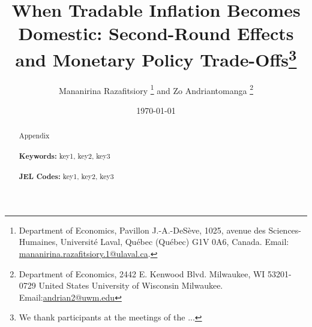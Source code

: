\documentclass[a4paper,12pt]{article}
\begin{document}
\begin{titlepage}
\title{When Tradable Inflation Becomes Domestic: Second-Round Effects and Monetary Policy Trade-Offs\thanks{We thank participants at the meetings of the ...}}
\author{Mananirina Razafitsiory \thanks{Department of Economics, Pavillon J.-A.-DeS\`eve, 1025, avenue des Sciences-Humaines, Universit\'e Laval, Qu\'ebec (Qu\'ebec) G1V 0A6, Canada.  Email: \url{mananirina.razafitsiory.1@ulaval.ca}.
} and Zo Andriantomanga \thanks{Department of Economics, 2442 E. Kenwood Blvd. Milwaukee, WI 53201-0729 United States University of Wisconsin Milwaukee.  Email:\url{andrian2@uwm.edu}}
}

\date{\today}
\maketitle
\begin{abstract}
\noindent Appendix \\
\vspace{0in}\\
\noindent\textbf{Keywords:} key1, key2, key3\\
\vspace{0in}\\
\noindent\textbf{JEL Codes:} key1, key2, key3\\

\bigskip
\end{abstract}
\setcounter{page}{0}
\thispagestyle{empty}
\end{titlepage}
\pagebreak \newpage




\doublespacing
\end{document}
